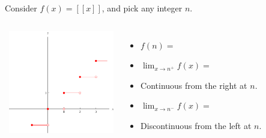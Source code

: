 \begin{frame}
\begin{example}[Example 3, p. 115]
Consider $f(x) = [[x]]$, and pick any integer $n$.
\begin{columns}[c]
\ \includegraphics[height=4.5cm]{continuity/pictures/02-05-ex2d.pdf}%
\begin{itemize}
\item<2-| alert@3-4>  $f(n) = $ 
\item<2-| alert@5-6>  $\lim_{x\rightarrow n^+} f(x) = $ 
\item<7->  Continuous from the right at $n$.
\item<2-| alert@8-9>  $\lim_{x\rightarrow n^-} f(x) = $ 
\item<10->  Discontinuous from the left at $n$.
\end{itemize}
\end{columns}
\end{example}
\end{frame}
